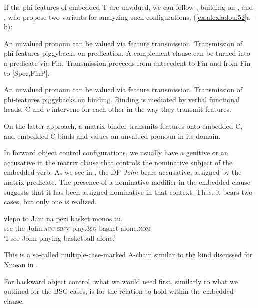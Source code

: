 \documentclass[output=paper]{langsci/langscibook}
\begin{document}
If the phi-features of embedded T are unvalued, we can follow \citet{Grano2016}, building on \citet{Kratzer2009}, and \citet{Landau2015}, who propose two variants for analyzing such configurations, (\ref{ex:alexiadou:52}a--b):


\ea%
    \label{ex:alexiadou:52}
    \ea
    \begin{xlisti}
    \ex An unvalued pronoun can be valued via feature transmission.
    \ex Transmission of phi-features piggybacks on predication.
    \ex A complement clause can be turned into a predicate via Fin.
    \ex Transmission proceeds from antecedent to Fin and from Fin to [Spec,FinP].
    \end{xlisti}
    \ex
    \begin{xlisti}
    \ex An unvalued pronoun can be valued via feature transmission.
    \ex Transmission of phi-features piggybacks on binding.
    \ex Binding is mediated by verbal functional heads.
    \ex C and \textit{v} intervene for each other in the way they transmit features.
    \end{xlisti}
    \z
\z

On the latter approach, a matrix binder transmits features onto embedded C, and embedded C binds and values an unvalued pronoun in its  domain.

In forward object control configurations, we usually have a genitive or an accusative in the matrix clause that controls the nominative subject of the embedded verb. As we see in , the DP \textit{John} bears accusative, assigned by the matrix predicate. The presence of a nominative modifier in the embedded clause suggests that it has been assigned nominative in that context. Thus, it bears two cases, but only one is realized.

\ea%
    \label{ex:alexiadou:53}
    \gll vlepo to    Jani        na   pezi        basket  {monos tu}.\\
         see     the John.\textsc{acc} \textsc{sbjv} play.\textsc{3sg} basket  alone.\textsc{nom}\\
    \glt ‘I see John playing basketball alone.’
    \z

This is a so-called multiple-case-marked A-chain similar to the kind discussed for Niuean in \citet[67]{Bejar1999}.

For backward object control, what we would need first, similarly to what we outlined for the BSC cases, is for the  relation to hold within the embedded clause:
\end{document}
